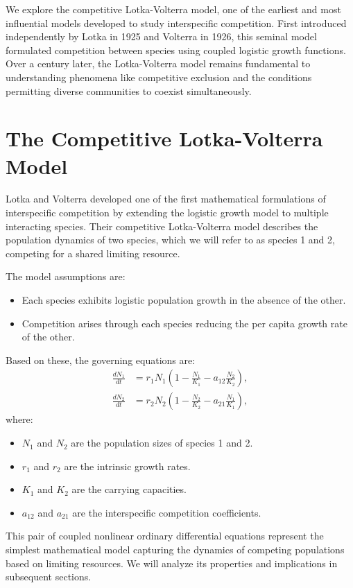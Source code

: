 We explore the competitive Lotka-Volterra model, one of the earliest and most influential models developed to study interspecific competition. First introduced independently by Lotka in 1925 and Volterra in 1926, this seminal model formulated competition between species using coupled logistic growth functions. Over a century later, the Lotka-Volterra model remains fundamental to understanding phenomena like competitive exclusion and the conditions permitting diverse communities to coexist simultaneously.

\section{The Competitive Lotka-Volterra Model}

Lotka and Volterra developed one of the first mathematical formulations of interspecific competition by extending the logistic growth model to multiple interacting species. Their competitive Lotka-Volterra model describes the population dynamics of two species, which we will refer to as species 1 and 2, competing for a shared limiting resource.

The model assumptions are:
\begin{itemize}
\item Each species exhibits logistic population growth in the absence of the other.
\item Competition arises through each species reducing the per capita growth rate of the other.
\end{itemize}
Based on these, the governing equations are:
\begin{align}
\frac{dN_1}{dt} &= r_1N_1\left(1 - \frac{N_1}{K_1} - a_{12}\frac{N_2}{K_2}\right) \label{eq:13.01}, \\
\frac{dN_2}{dt} &= r_2N_2\left(1 - \frac{N_2}{K_2} - a_{21}\frac{N_1}{K_1}\right), \label{eq:13.02}
\end{align}
where:
\begin{itemize}
\item $N_1$ and $N_2$ are the population sizes of species 1 and 2.
\item $r_1$ and $r_2$ are the intrinsic growth rates.
\item $K_1$ and $K_2$ are the carrying capacities.
\item $a_{12}$ and $a_{21}$ are the interspecific competition coefficients. 
\end{itemize}
This pair of coupled nonlinear ordinary differential equations represent the simplest mathematical model capturing the dynamics of competing populations based on limiting resources. We will analyze its properties and implications in subsequent sections.

